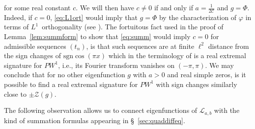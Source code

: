 \documentclass[12pt]{amsart}
\theoremstyle{plain}
\numberwithin{equation}{section}
\theoremstyle{definition}
\newcommand{\sgn}{\mathrm{sgn}}
\newcommand{\Cone}{\mathscr{C}}
\begin{document}
for some real constant $c$. We will then have $c\neq 0$ if and only if $a=\frac{1}{2\Cone}$ and $g=\Phi$. Indeed, if $c= 0$, \eqref{eq:L1ort} would imply that $g=\Phi$ by the characterization of 
$\varphi$ in terms of $L^1$~orthogonality (see \cite[Thm. 3.6]{BCOS}). The fortuitous fact used in the proof of Lemma~\ref{lem:summform} to show that \eqref{eq:summ} would imply $c=0$ for admissible sequences $(t_n)$, is that such sequences are at finite $\ell^2$ distance from the sign changes of $\sgn \cos(\pi x)$ which in the terminology of \cite{LS18} is a real extremal signature for $PW^1$, i.e., its Fourier transform vanishes on $(-\pi, \pi)$. We may conclude that for no other eigenfunction $g$ with $a>0$ and real simple zeros, is it possible to find a real extremal signature  for $PW^1$ with  
sign changes similarly close to $\pm \mathcal{Z}(g)$. 

The following observation allows us to connect eigenfunctions of 
$\mathcal{L}_{a,b}$ with the kind of summation formulas appearing in \S~\ref{sec:quaddiffeq}.
\end{document}
